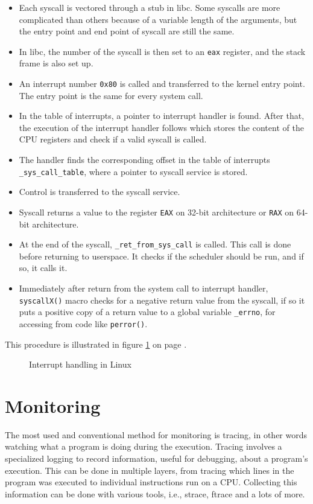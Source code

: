 \begin{itemize}
	\item Each syscall is vectored through a stub in libc.
    	  Some syscalls are more complicated than others because of a variable length of the arguments, but the entry point and end point of syscall are still the same.
	\item In libc, the number of the syscall is then set to an \texttt{eax} register, and the stack frame is also set up.
	\item An interrupt number \texttt{0x80} is called and transferred to the kernel entry point.
    	  The entry point is the same for every system call.
	\item In the table of interrupts, a pointer to interrupt handler is found.
    	  After that, the execution of the interrupt handler follows which stores the content of the CPU registers and check if a valid syscall is called.
	\item The handler finds the corresponding offset in the table of interrupts \texttt{\_sys\_call\_table}, where a pointer to syscall service is stored.
	\item Control is transferred to the syscall service.
	\item Syscall returns a value to the register \texttt{EAX} on 32-bit architecture or \texttt{RAX} on 64-bit architecture.
	\item At the end of the syscall, \texttt{\_ret\_from\_sys\_call\(\)} is called.
    	  This call is done before returning to userspace.
          It checks if the scheduler should be run, and if so, it calls it.
	\item Immediately after return from the system call to interrupt handler, \texttt{syscallX()} macro checks for a negative return value from the syscall, if so it puts a positive copy of a return value to a global variable \texttt{\_errno}, for accessing from code like \texttt{perror()}.
\end{itemize}

This procedure is illustrated in figure \ref{fig:tikz:int_handling} on page \pageref{fig:tikz:int_handling}.

\begin{figure}[]
  \centering
  
  \caption{Interrupt handling in Linux}
  \label{fig:tikz:int_handling}
\end{figure}


\section{Monitoring}
The most used and conventional method for monitoring is tracing, in other words watching what a program is doing during the execution.
Tracing involves a specialized logging to record information, useful for debugging, about a program's execution.
This can be done in multiple layers, from tracing which lines in the program was executed to individual instructions run on a CPU.
Collecting this information can be done with various tools, i.e., strace, ftrace and a lots of more.

